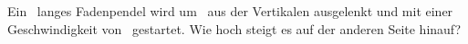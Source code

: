 Ein \LpO\ langes Fadenpendel wird um \alpO\ aus der Vertikalen ausgelenkt und mit einer Geschwindigkeit von \vnpO\ gestartet. Wie hoch steigt es auf der anderen Seite hinauf?
